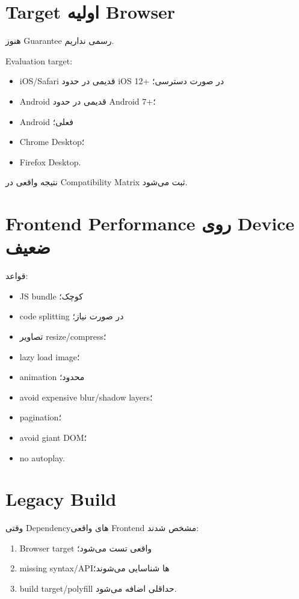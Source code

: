 \section{Target اولیه Browser}

هنوز Guarantee رسمی نداریم.

Evaluation target:
\begin{itemize}
  \item iOS/Safari قدیمی در حدود iOS 12+ در صورت دسترسی؛
  \item Android قدیمی در حدود Android 7+؛
  \item Android فعلی؛
  \item Chrome Desktop؛
  \item Firefox Desktop.
\end{itemize}

نتیجه واقعی در Compatibility Matrix ثبت می‌شود.

\section{Frontend Performance روی Device ضعیف}

قواعد:
\begin{itemize}
  \item JS bundle کوچک؛
  \item code splitting در صورت نیاز؛
  \item تصاویر resize/compress؛
  \item lazy load image؛
  \item animation محدود؛
  \item avoid expensive blur/shadow layers؛
  \item pagination؛
  \item avoid giant DOM؛
  \item no autoplay.
\end{itemize}

\section{Legacy Build}

وقتی Dependencyهای واقعی Frontend مشخص شدند:
\begin{enumerate}
  \item Browser target واقعی تست می‌شود؛
  \item missing syntax/APIها شناسایی می‌شوند؛
  \item build target/polyfill حداقلی اضافه می‌شود.
\end{enumerate}

